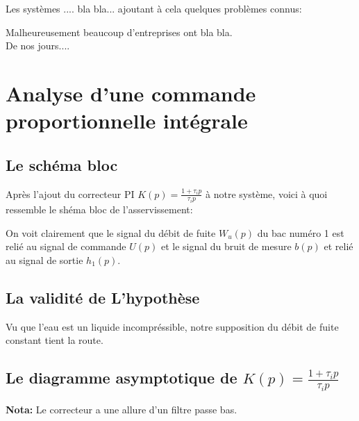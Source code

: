 \documentclass[12pt, a4paper, openany]{report}
\begin{document}
   Les systèmes .... bla bla... ajoutant à cela quelques problèmes connus:
    
   Malheureusement beaucoup d'entreprises ont bla bla. \\
   
   De nos jours....
   

\chapter{Analyse d'une commande proportionnelle intégrale}

 \section{Le schéma bloc} 

	Après l'ajout du correcteur PI $K(p)=\frac {1+\tau_{i}p}{\tau_{i}p}$ à notre système, voici à quoi ressemble le       shéma bloc de l'asservissement:
  \begin{center}
    \label{fig2}
  \end{center}    
 
	On voit clairement que le signal du débit de fuite $W_{u}(p)$ du bac numéro 1 est relié au signal de commande $U(p)$ et le signal du bruit de mesure $b(p)$ et relié au signal de sortie $h_{1}(p)$.    
	
 \section{La validité de L'hypothèse} 
        
	Vu que l'eau est un liquide incompréssible, notre supposition du débit de fuite constant tient la route.
	
 \section{Le diagramme asymptotique de $K(p)=\frac {1+\tau_{i}p}{\tau_{i}p}$} 
 
  \begin{center}
    \label{fig3}
  \end{center}

  \textbf{Nota:} Le correcteur a une allure d'un filtre passe bas.
\end{document}
